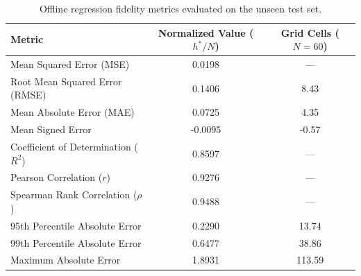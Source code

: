 \begin{table}[H]
\centering
\small
\begin{tabular}{lcc}
\toprule
\textbf{Metric} & \textbf{Normalized Value ($h^\ast / N$)} & \textbf{Grid Cells ($N=60$)} \\
\midrule
Mean Squared Error (MSE) & 0.0198 & --- \\
Root Mean Squared Error (RMSE) & 0.1406 & 8.43 \\
Mean Absolute Error (MAE) & 0.0725 & 4.35 \\
Mean Signed Error & -0.0095 & -0.57 \\
Coefficient of Determination ($R^2$) & 0.8597 & --- \\
Pearson Correlation ($r$) & 0.9276 & --- \\
Spearman Rank Correlation ($\rho$) & 0.9488 & --- \\
95th Percentile Absolute Error & 0.2290 & 13.74 \\
99th Percentile Absolute Error & 0.6477 & 38.86 \\
Maximum Absolute Error & 1.8931 & 113.59 \\
\bottomrule
\end{tabular}
\caption{Offline regression fidelity metrics evaluated on the unseen test set.}
\label{tab:regression_results}
\end{table}
